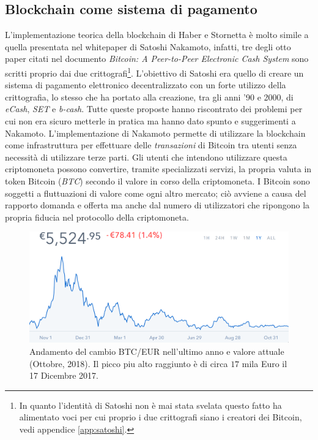 \begin{enumerate}[1.]
\subsection{Blockchain come sistema di pagamento}
L'implementazione teorica della blockchain di Haber e Stornetta è molto simile a quella presentata nel whitepaper di Satoshi Nakamoto\cite{bitcoin}, infatti, tre degli otto paper citati nel documento \textit{Bitcoin: A Peer-to-Peer Electronic Cash System} sono scritti proprio dai due crittografi\footnote{In quanto l'identità di Satoshi non è mai stata svelata questo fatto ha alimentato voci per cui proprio i due crittografi siano i creatori dei Bitcoin, vedi appendice \ref{app:satoshi}.}.\newline
L'obiettivo di Satoshi era quello di creare un sistema di pagamento elettronico decentralizzato con un forte utilizzo della crittografia, lo stesso che ha portato alla creazione, tra gli anni '90 e 2000, di \textit{eCash}, \textit{SET} e \textit{b-cash}. Tutte queste proposte hanno riscontrato dei problemi per cui non era sicuro metterle in pratica ma hanno dato spunto e suggerimenti a Nakamoto.
L'implementazione di Nakamoto permette di utilizzare la blockchain come infrastruttura per effettuare delle \textit{transazioni} di Bitcoin tra utenti senza necessità di utilizzare terze parti. Gli utenti che intendono utilizzare questa criptomoneta possono convertire, tramite specializzati servizi, la propria valuta in token Bitcoin (\textit{BTC}) secondo il valore in corso della criptomoneta.\newline
I Bitcoin sono soggetti a fluttuazioni di valore come ogni altro mercato; ciò avviene a causa del rapporto domanda e offerta ma anche dal numero di utilizzatori che ripongono la propria fiducia nel protocollo della criptomoneta.
\begin{figure}
    \centering
    \includegraphics[width=\textwidth]{images/bitcoinchart.png}
    \caption{Andamento del cambio BTC/EUR nell'ultimo anno e valore attuale (Ottobre, 2018). Il picco piu alto raggiunto è di circa $17$ mila Euro il 17 Dicembre 2017.}
\end{figure}


\end{enumerate}
